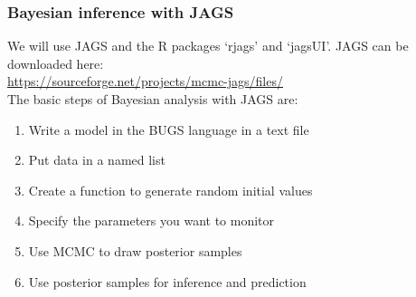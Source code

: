 \documentclass[color=usenames,dvipsnames]{beamer}\usepackage[]{graphicx}\usepackage[]{color}
\begin{document}
\begin{frame}
  \frametitle{Bayesian inference with JAGS}
  We will use JAGS and the R packages `rjags' and `jagsUI'.
  JAGS can be downloaded here:  \\
  \centering
  \vfill
  \href{
    https://sourceforge.net/projects/mcmc-jags/files/}{
    \large
    \color{blue}
    https://sourceforge.net/projects/mcmc-jags/files/
  } \\
  \pause
  \vfill
  \flushleft
  The basic steps of Bayesian analysis with JAGS are:
  \begin{enumerate}%
    \item Write a model in the BUGS language in a text file
    \item Put data in a named list
    \item Create a function to generate random initial values
    \item Specify the parameters you want to monitor
    \item Use MCMC to draw posterior samples
    \item Use posterior samples for inference and prediction
  \end{enumerate}
\end{frame}
\end{document}
